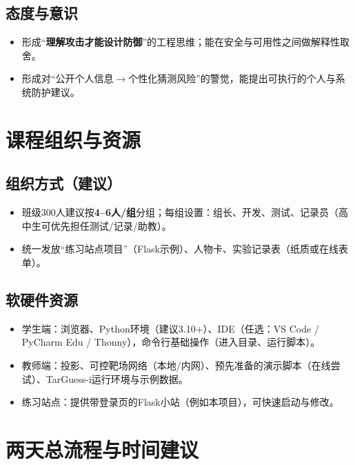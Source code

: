 \documentclass[UTF8,a4paper,12pt]{ctexart}
\begin{document}
\subsection*{态度与意识}
\begin{itemize}
  \item 形成``\textbf{理解攻击才能设计防御}''的工程思维；能在安全与可用性之间做解释性取舍。
  \item 形成对``公开个人信息$\rightarrow$个性化猜测风险''的警觉，能提出可执行的个人与系统防护建议。
\end{itemize}

\section{课程组织与资源}
\subsection{组织方式（建议）}
\begin{itemize}
  \item 班级300人建议按\textbf{4--6人/组}分组；每组设置：组长、开发、测试、记录员（高中生可优先担任测试/记录/助教）。
  \item 统一发放``练习站点项目''（Flask示例）、人物卡、实验记录表（纸质或在线表单）。
\end{itemize}

\subsection{软硬件资源}
\begin{itemize}
  \item 学生端：浏览器、Python环境（建议3.10+）、IDE（任选：VS Code / PyCharm Edu / Thonny），命令行基础操作（进入目录、运行脚本）。
  \item 教师端：投影、可控靶场网络（本地/内网）、预先准备的演示脚本（在线尝试）、TarGuess-i运行环境与示例数据。
  \item 练习站点：提供带登录页的Flask小站（例如本项目），可快速启动与修改。
\end{itemize}

\section{两天总流程与时间建议}
\end{document}
